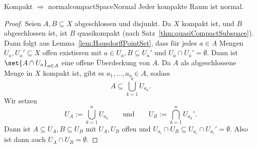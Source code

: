 \documentclass[language=ngerman]{TemplateLecture} %
\begin{document}
\begin{thm}{Kompakt $\Rightarrow$ normal}{compactSpaceNormal}
    Jeder kompakte Raum ist normal.
\end{thm}
\begin{proof}
    Seien $A, B \subseteq X$ abgeschlossen und disjunkt. Da $X$ kompakt ist, und $B$ abgeschlossen ist, ist $B$ quasikompakt (nach Satz~\ref{thm:quasiCompactSubspace}). Dann folgt aus Lemma~\ref{lem:HausdorffPointSet}, dass für jedes $a \in A$ Mengen $U_a, U_a' \subseteq X$ offen existieren mit $a \in U_a, B \subseteq U_a'$ und $U_a \cap U_a' = \emptyset$. 
    Dann ist $\set{A \cap U_a}_{a \in A}$ eine offene Überdeckung von $A$. Da $A$ als abgeschlossene Menge in $X$ kompakt ist, gibt es $a_1, \ldots, a_n \in A$, sodass
    \begin{equation*}
        A \subseteq \bigcup_{k = 1}^n U_{a_k}.
    \end{equation*}
    Wir setzen
    \begin{equation*}
        U_A := \bigcup_{k = 1}^n U_{a_k} \quad \quad \text{und} \quad \quad U_B := \bigcap_{k = 1}^n U_{a_k}'.
    \end{equation*}
    Dann ist $A \subseteq U_A, B \subseteq U_B$ mit $U_A, U_B$ offen und $U_{a_i} \cap U_B \subseteq U_{a_i} \cap U_{a_i}' = \emptyset$. Also ist dann auch $U_A \cap U_B = \emptyset$.
\end{proof}
\end{document}
